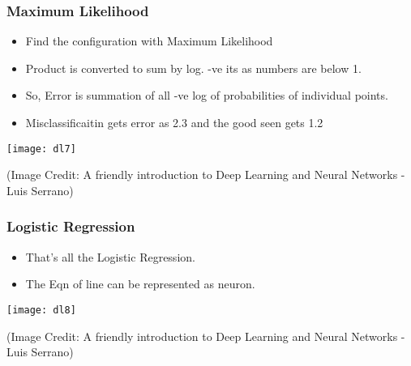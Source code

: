 
\begin{frame}[fragile] \frametitle{Maximum Likelihood}
\begin{itemize}
\item Find the configuration with Maximum Likelihood
\item Product is converted to sum by log. -ve its as numbers are below 1.
\item So, Error is summation of all -ve log of probabilities of individual points.
\item Misclassificaitin gets error as 2.3 and the good seen gets 1.2
\end{itemize}
\begin{center}
\texttt{[image: dl7]}
\end{center}
{\tiny (Image Credit: A friendly introduction to Deep Learning and Neural Networks -  Luis Serrano)}
\end{frame}

\begin{frame}[fragile] \frametitle{Logistic Regression}
\begin{itemize}
\item That's all the Logistic Regression.
\item The Eqn of line can be represented as neuron.
\end{itemize}
\begin{center}
\texttt{[image: dl8]}
\end{center}
{\tiny (Image Credit: A friendly introduction to Deep Learning and Neural Networks -  Luis Serrano)}
\end{frame}

